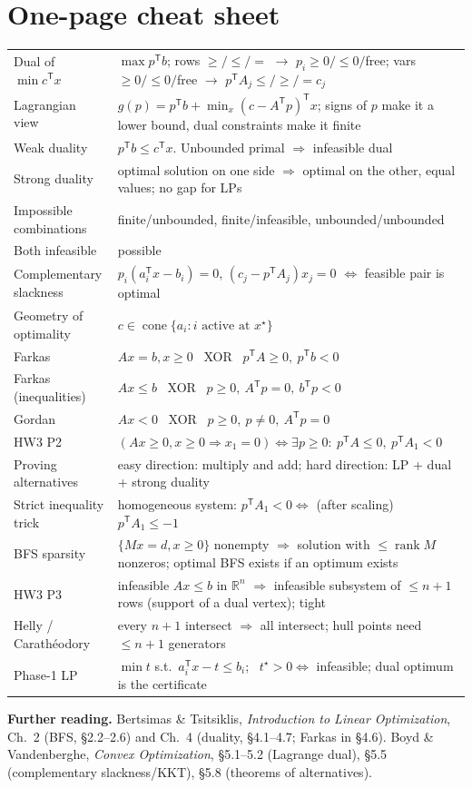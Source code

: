 \documentclass[11pt]{article}
\newcommand{\R}{\mathbb{R}}
\newcommand{\T}{^{\mathsf T}}
\theoremstyle{definition}
\theoremstyle{plain}
\theoremstyle{remark}
\begin{document}
\section{One-page cheat sheet}
\begin{center}\renewcommand{\arraystretch}{1.3}
\begin{tabular}{@{}>{\raggedright}p{}p{}@{}}\toprule
Dual of $\min c\T x$ & $\max p\T b$; rows $\ge/\le/=$ $\to$ $p_i\ge0/\le0/$free; vars $\ge0/\le0/$free $\to$ $p\T A_j\le/\ge/=c_j$\\
Lagrangian view & $g(p)=p\T b+\min_x(c-A\T p)\T x$; signs of $p$ make it a lower bound, dual constraints make it finite\\
Weak duality & $p\T b\le c\T x$. Unbounded primal $\Rightarrow$ infeasible dual\\
Strong duality & optimal solution on one side $\Rightarrow$ optimal on the other, equal values; no gap for LPs\\
Impossible combinations & finite/unbounded, finite/infeasible, unbounded/unbounded\\
Both infeasible & possible\\
Complementary slackness & $p_i(a_i\T x-b_i)=0$, $(c_j-p\T A_j)x_j=0$ $\iff$ feasible pair is optimal\\
Geometry of optimality & $c\in\operatorname{cone}\{a_i:i\text{ active at }x^\star\}$\\
Farkas & $Ax=b,x\ge0$ \ XOR \ $p\T A\ge0,\ p\T b<0$\\
Farkas (inequalities) & $Ax\le b$ \ XOR \ $p\ge0,\ A\T p=0,\ b\T p<0$\\
Gordan & $Ax<0$ \ XOR \ $p\ge0,\ p\neq0,\ A\T p=0$\\
HW3 P2 & $(Ax\ge0,x\ge0\Rightarrow x_1=0)\iff\exists p\ge0:\ p\T A\le0,\ p\T A_1<0$\\
Proving alternatives & easy direction: multiply and add; hard direction: LP + dual + strong duality\\
Strict inequality trick & homogeneous system: $p\T A_1<0\iff$ (after scaling) $p\T A_1\le-1$\\
BFS sparsity & $\{Mx=d,x\ge0\}$ nonempty $\Rightarrow$ solution with $\le\operatorname{rank}M$ nonzeros; optimal BFS exists if an optimum exists\\
HW3 P3 & infeasible $Ax\le b$ in $\R^n$ $\Rightarrow$ infeasible subsystem of $\le n+1$ rows (support of a dual vertex); tight\\
Helly / Carath\'eodory & every $n+1$ intersect $\Rightarrow$ all intersect; hull points need $\le n+1$ generators\\
Phase-1 LP & $\min t$ s.t.\ $a_i\T x-t\le b_i$; \ $t^\star>0\iff$ infeasible; dual optimum is the certificate\\ \bottomrule
\end{tabular}\end{center}

\bigskip\noindent\textbf{Further reading.} Bertsimas \& Tsitsiklis, \emph{Introduction to Linear Optimization}, Ch.~2 (BFS, \S2.2--2.6) and Ch.~4 (duality, \S4.1--4.7; Farkas in \S4.6). Boyd \& Vandenberghe, \emph{Convex Optimization}, \S5.1--5.2 (Lagrange dual), \S5.5 (complementary slackness/KKT), \S5.8 (theorems of alternatives).
\end{document}
